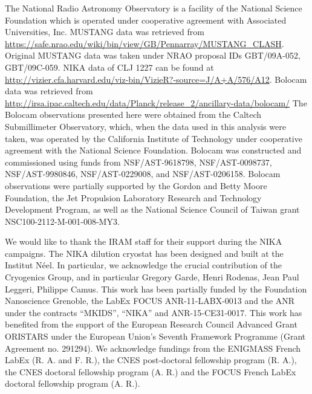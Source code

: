 \documentclass[twocolumn,traditabstract]{aa}
\begin{document}
The National Radio Astronomy Observatory is a facility of the National Science Foundation which is operated
under cooperative agreement with Associated Universities, Inc. MUSTANG data was retrieved from
\url{https://safe.nrao.edu/wiki/bin/view/GB/Pennarray/MUSTANG_CLASH}. Original MUSTANG data was
taken under NRAO proposal IDs GBT/09A-052, GBT/09C-059. NIKA data of CLJ 1227 can be found at
\url{http://vizier.cfa.harvard.edu/viz-bin/VizieR?-source=J/A+A/576/A12}. Bolocam data was retrieved from
\url{http://irsa.ipac.caltech.edu/data/Planck/release\_2/ancillary-data/bolocam/}
The Bolocam observations presented here were obtained from the Caltech Submillimeter Observatory, which,
when the data used in this analysis were taken, was operated by the California Institute of Technology under
cooperative agreement with the National Science Foundation. Bolocam was constructed and commissioned using funds
from NSF/AST-9618798, NSF/AST-0098737, NSF/AST-9980846, NSF/AST-0229008, and NSF/AST-0206158. Bolocam observations
were partially supported by the Gordon and Betty Moore Foundation, the Jet Propulsion Laboratory Research and
Technology Development Program, as well as the National Science Council of Taiwan grant NSC100-2112-M-001-008-MY3.

We would like to thank the IRAM staff for their support during the NIKA campaigns. 
The NIKA dilution cryostat has been designed and built at the Institut N\'eel. 
In particular, we acknowledge the crucial contribution of the Cryogenics Group, and 
in particular Gregory Garde, Henri Rodenas, Jean Paul Leggeri, Philippe Camus. 
This work has been partially funded by the Foundation Nanoscience Grenoble, the LabEx FOCUS ANR-11-LABX-0013 and 
the ANR under the contracts ``MKIDS'', ``NIKA'' and ANR-15-CE31-0017. 
This work has benefited from the support of the European Research Council Advanced Grant ORISTARS 
under the European Union's Seventh Framework Programme (Grant Agreement no. 291294).
We acknowledge fundings from the ENIGMASS French LabEx (R. A. and F. R.), 
the CNES post-doctoral fellowship program (R. A.), the CNES doctoral fellowship program (A. R.) and 
the FOCUS French LabEx doctoral fellowship program (A. R.).


\end{document}
